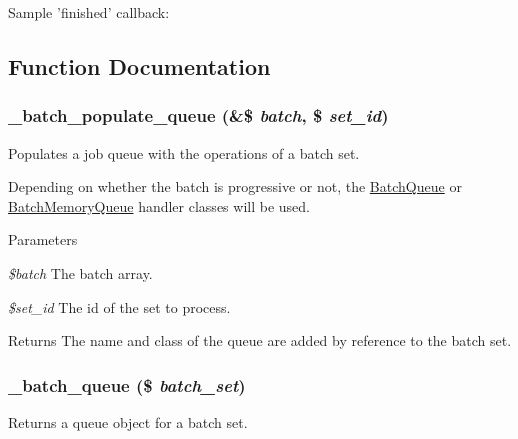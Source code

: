 Sample 'finished' callback: 
 

\subsection{Function Documentation}
\hypertarget{group__batch_gaac34897148f5ea89ce15f4f95c34557e}{
\subsubsection[{\_\-batch\_\-populate\_\-queue}]{\setlength{\rightskip}{0pt plus 5cm}\_\-batch\_\-populate\_\-queue (\&\$ {\em batch}, \/  \$ {\em set\_\-id})}}
\label{group__batch_gaac34897148f5ea89ce15f4f95c34557e}
Populates a job queue with the operations of a batch set.

Depending on whether the batch is progressive or not, the \hyperlink{classBatchQueue}{BatchQueue} or \hyperlink{classBatchMemoryQueue}{BatchMemoryQueue} handler classes will be used.


\begin{DoxyParams}{Parameters}
\item[{\em \$batch}]The batch array. \item[{\em \$set\_\-id}]The id of the set to process.\end{DoxyParams}
\begin{DoxyReturn}{Returns}
The name and class of the queue are added by reference to the batch set. 
\end{DoxyReturn}
\hypertarget{group__batch_ga93c80df7641ba3be8bc535a9c1fd13c2}{
\subsubsection[{\_\-batch\_\-queue}]{\setlength{\rightskip}{0pt plus 5cm}\_\-batch\_\-queue (\$ {\em batch\_\-set})}}
\label{group__batch_ga93c80df7641ba3be8bc535a9c1fd13c2}
Returns a queue object for a batch set.


